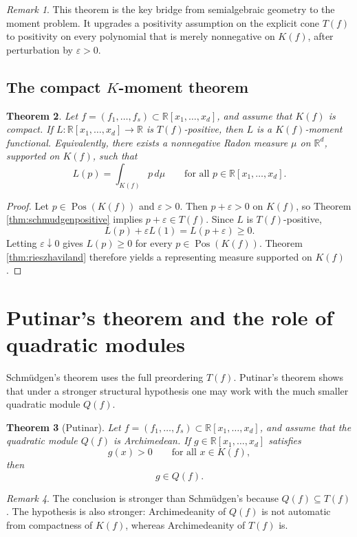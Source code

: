 \documentclass[11pt]{amsart}
\numberwithin{equation}{section}
\newtheorem{theorem}{Theorem}[section]
\theoremstyle{definition}
\theoremstyle{remark}
\newtheorem{remark}[theorem]{Remark}
\newcommand{\R}{\mathbb{R}}
\newcommand{\Rxd}{\R[x_1,\dots,x_d]}
\newcommand{\Pos}{\operatorname{Pos}}
\newcommand{\eps}{\varepsilon}
\newcommand{\1}{\mathbf{1}}
\begin{document}
\begin{remark}
This theorem is the key bridge from semialgebraic geometry to the moment problem. It upgrades a positivity assumption on the explicit cone \(T(f)\) to positivity on every polynomial that is merely nonnegative on \(K(f)\), after perturbation by \(\eps>0\).
\end{remark}

\subsection{The compact \(K\)-moment theorem}

\begin{theorem}\label{thm:compactkmomentgeom}
Let \(f=(f_1,\dots,f_s)\subset\Rxd\), and assume that \(K(f)\) is compact. If \(L:\Rxd\to\R\) is \(T(f)\)-positive, then \(L\) is a \(K(f)\)-moment functional. Equivalently, there exists a nonnegative Radon measure \(\mu\) on \(\R^d\), supported on \(K(f)\), such that
\[
L(p)=\int_{K(f)} p\,d\mu \qquad \text{for all }p\in\Rxd.
\]
\end{theorem}

\begin{proof}
Let \(p\in\Pos(K(f))\) and \(\eps>0\). Then \(p+\eps>0\) on \(K(f)\), so Theorem \ref{thm:schmudgenpositive} implies \(p+\eps\in T(f)\). Since \(L\) is \(T(f)\)-positive,
\[
L(p)+\eps L(1)=L(p+\eps)\ge 0.
\]
Letting \(\eps\downarrow 0\) gives \(L(p)\ge 0\) for every \(p\in\Pos(K(f))\). Theorem \ref{thm:rieszhaviland} therefore yields a representing measure supported on \(K(f)\).
\end{proof}

\section{Putinar's theorem and the role of quadratic modules}\label{sec:putinar}

Schm\"udgen's theorem uses the full preordering \(T(f)\). Putinar's theorem shows that under a stronger structural hypothesis one may work with the much smaller quadratic module \(Q(f)\).

\begin{theorem}[Putinar]\label{thm:putinar}
Let \(f=(f_1,\dots,f_s)\subset\Rxd\), and assume that the quadratic module \(Q(f)\) is Archimedean. If \(g\in\Rxd\) satisfies
\[
g(x)>0 \qquad \text{for all }x\in K(f),
\]
then
\[
g\in Q(f).
\]
\end{theorem}

\begin{remark}
The conclusion is stronger than Schm\"udgen's because \(Q(f)\subseteq T(f)\). The hypothesis is also stronger: Archimedeanity of \(Q(f)\) is not automatic from compactness of \(K(f)\), whereas Archimedeanity of \(T(f)\) is.
\end{remark}
\end{document}
